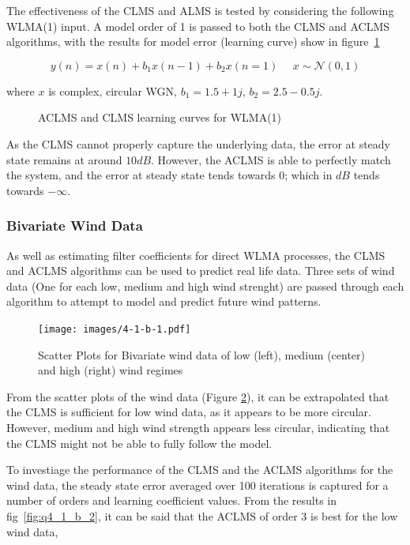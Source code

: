 \documentclass[main.tex]{subfiles}
\begin{document}
The effectiveness of the CLMS and ALMS is tested by considering the following WLMA(1) input. A model order of 1 is passed to both the CLMS and ACLMS algorithms, with the results for model error (learning curve) show in figure~\ref{fig:q4_1_a}

\begin{equation}
y(n) = x(n) + b_1x(n-1) + b_2x(n=1)\ \ \ \ \ \ x \sim \mathcal{N}(0,1)
\end{equation}

where $x$ is complex, circular WGN, $b_1 = 1.5+1j$, $b_2  = 2.5-0.5j$.

\begin{figure}[H]
	\centering 
	\resizebox{0.9\textwidth}{!}{}
	\caption{ACLMS and CLMS learning curves for WLMA(1)}
	\label{fig:q4_1_a}
\end{figure}

As the CLMS cannot properly capture the underlying data, the error at steady state remains at around $10dB$. However, the ACLMS is able to perfectly match the system, and the error at steady state tends towards 0; which in $dB$ tends towards $-\infty$.

\subsubsection{Bivariate Wind Data}

As well as estimating filter coefficients for direct WLMA processes, the CLMS and ACLMS algorithms can be used to predict real life data. Three sets of wind data (One for each low, medium and high wind strenght) are passed through each algorithm to attempt to model and predict future wind patterns.


\begin{figure}[H]
	\centering
	\texttt{[image: images/4-1-b-1.pdf]}
	\caption{Scatter Plots for Bivariate wind data of low (left), medium (center) and high (right) wind regimes}
	\label{fig:q4_1_b}
\end{figure}


From the scatter plots of the wind data (Figure \ref{fig:q4_1_b}), it can be extrapolated that the CLMS is sufficient for low wind data, as it appears to be more circular. However, medium and high wind strength appears less circular, indicating that the CLMS might not be able to fully follow the model. 

To investiage the performance of the CLMS and the ACLMS algorithms for the wind data, the steady state error averaged over 100 iterations is captured for a number of orders and learning coefficient values. From the results in fig~\ref{fig:q4_1_b_2}, it can be said that the ACLMS of order 3 is best for the low wind data, 
\end{document}
